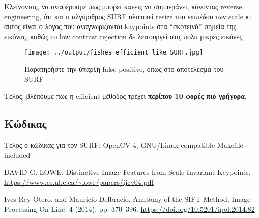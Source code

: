 \documentclass[11pt]{scrartcl} %
\begin{document}
Κλείνοντας, να αναφέρουμε πως μπορεί κανεις να συμπεράνει, κάνοντας reverse engineering, ότι
και ο αλγόριθμος SURF υλοποιεί resize του επιπέδου των scale κι αυτός είναι ο λόγος που αναγνωρίζονται
kaypoints στα ``σκοτεινά'' σημεία της εικόνας, καθώς το low contrast rejection δε λειτουργεί στις
πολύ μικρές εικόνες.

\begin{figure}[H]
  \centerline{\texttt{[image: ../output/fishes\_efficient\_like\_SURF.jpg]}}
  \caption{Παρατηρήστε την ύπαρξη false-positive, όπως στο αποτέλεσμα του SURF}
\end{figure}

Τέλος, βλέπουμε πως η efficient μέθοδος τρέχει \textbf{περίπου 10 φορές πιο γρήγορα}.

\subsection{Κώδικας}

Τέλος ο κώδικας για τον SURF:
{OpenCV-4, GNU/Linux compatible Makefile included}

\begin{thebibliography}{2}

DAVID G. LOWE, Distinctive Image Features from Scale-Invariant Keypoints,
\url{https://www.cs.ubc.ca/~lowe/papers/ijcv04.pdf}

Ives Rey Otero, and Mauricio Delbracio, Anatomy of the SIFT Method, Image Processing On Line, 4 (2014), pp. 370–396.
\url{https://doi.org/10.5201/ipol.2014.82}

\end{thebibliography}
\end{document}
